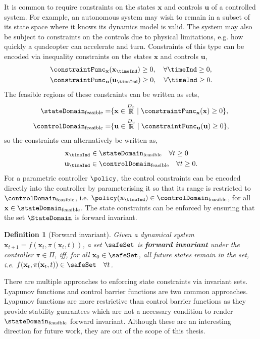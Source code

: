 \documentclass{mimosis-class/mimosis}
\newtheorem{definition}{Definition}[section]
\numberwithin{equation}{chapter}
\DeclareMathOperator{\R}{\mathbb{R}}
\newcommand{\StateDim}{\ensuremath{{D_x}}}
\newcommand{\ControlDim}{\ensuremath{{D_u}}}
\newcommand{\state}{\ensuremath{\mathbf{x}}}
\newcommand{\control}{\ensuremath{\mathbf{u}}}
\begin{document}
It is common to require constraints on the states \(\state\) and controls \(\control\) of a controlled system.
For example, an autonomous system may wish to remain in a subset of its state space where it knows its dynamics model
is valid.
The system may also be subject to constraints on the controls due to physical limitations, e.g.
how quickly a quadcopter can accelerate and turn.
Constraints of this type can be encoded via inequality constraints on the states \(\state\) and controls \(\control\),
\begin{align} \label{eq-}
&\constraintFunc_\state(\state_\timeInd) \geq 0, \quad \forall \timeInd \geq 0, \\
&\constraintFunc_\control(\control_\timeInd) \geq 0, \quad \forall \timeInd \geq 0.
\end{align}
The feasible regions of these constraints can be written as sets,
\begin{align} \label{eq-}
\stateDomain_{\text{feasible}} = &\{ \state \in \R^\StateDim \mid \constraintFunc_\state(\state) \geq 0 \}, \\
\controlDomain_{\text{feasible}} = &\{ \control \in \R^\ControlDim \mid \constraintFunc_\control(\control) \geq 0 \},
\end{align}
so the constraints can alternatively be written as,
\begin{align} \label{eq-}
\state_\timeInd &\in \stateDomain_{\text{feasible}}  \quad \forall t \geq 0 \\
\control_\timeInd &\in \controlDomain_{\text{feasible}} \quad \forall t \geq 0.
\end{align}
For a parametric controller \(\policy\), the control constraints can be encoded directly into the controller by
parameterising it so that its range is restricted to \(\controlDomain_{\text{feasible}}\),
i.e. \(\policy(\state_\timeInd) \in \controlDomain_{\text{feasible}}\),
for all \(\state \in \stateDomain_{\text{feasible}}\).
The state constraints can be enforced by ensuring that the set \(\StateDomain\) is forward invariant.
\begin{definition}[Forward invariant]
Given a dynamical system $\state_{t+1} = f(\state_t, \pi(\state_t, t))$,
a set $\safeSet$ is \textbf{forward invariant} under the controller $\pi \in \Pi$, iff, for all $\state_0 \in \safeSet$,
all future states remain in the set, i.e.  $f(\state_t, \pi(\state_t, t)) \in \safeSet \quad \forall t$.
\end{definition}
There are multiple approaches to enforcing state constraints via invariant sets.
Lyapunov functions \citep{lyapunovGeneral1992a} and control barrier functions \citep{amesControl2019} are two common
approaches.
Lyapunov functions are more restrictive than control barrier functions as they provide stability guarantees
which are not a necessary condition to render \(\stateDomain_{\text{feasible}}\) forward invariant.
Although these are an interesting direction for future work, they are out of the scope of this thesis.
\end{document}
